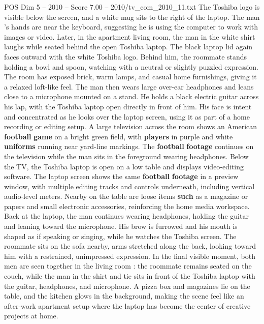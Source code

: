 \begin{textsample}{POS Dim 5 – 2010 – Score 7.00 – 2010/tv\_com\_2010\_11.txt}
The Toshiba logo is visible below the screen, and a white mug sits to the right of the laptop.
The man ’s hands are near the keyboard, suggesting he is using the computer to work with images or video.
Later, in the apartment living room, the man in the white shirt laughs while seated behind the open Toshiba laptop.
The black laptop lid again faces outward with the white Toshiba logo.
Behind him, the roommate stands holding a bowl and spoon, watching with a neutral or slightly puzzled expression.
The room has exposed brick, warm lamps, and casual home furnishings, giving it a relaxed loft-like feel.
The man then wears large over-ear headphones and leans close to a microphone mounted on a stand.
He holds a black electric guitar across his lap, with the Toshiba laptop open directly in front of him.
His face is intent and concentrated as he looks over the laptop screen, using it as part of a home recording or editing setup.
A large television across the room shows an American \textbf{football} \textbf{game} on a bright green field, with \textbf{players} in purple and white \textbf{uniforms} running near yard-line markings.
The \textbf{football} \textbf{footage} continues on the television while the man sits in the foreground wearing headphones.
Below the TV, the Toshiba laptop is open on a low table and displays video-editing software.
The laptop screen shows the same \textbf{football} \textbf{footage} in a preview window, with multiple editing tracks and controls underneath, including vertical audio-level meters.
Nearby on the table are loose items \textbf{such} as a magazine or papers and small electronic accessories, reinforcing the home media workspace.
Back at the laptop, the man continues wearing headphones, holding the guitar and leaning toward the microphone.
His brow is furrowed and his mouth is shaped as if speaking or singing, while he watches the Toshiba screen.
The roommate sits on the sofa nearby, arms stretched along the back, looking toward him with a restrained, unimpressed expression.
In the final visible moment, both men are seen together in the living room : the roommate remains seated on the couch, while the man in the shirt and tie sits in front of the Toshiba laptop with the guitar, headphones, and microphone.
A pizza box and magazines lie on the table, and the kitchen glows in the background, making the scene feel like an after-work apartment setup where the laptop has become the center of creative projects at home.

\end{textsample}
